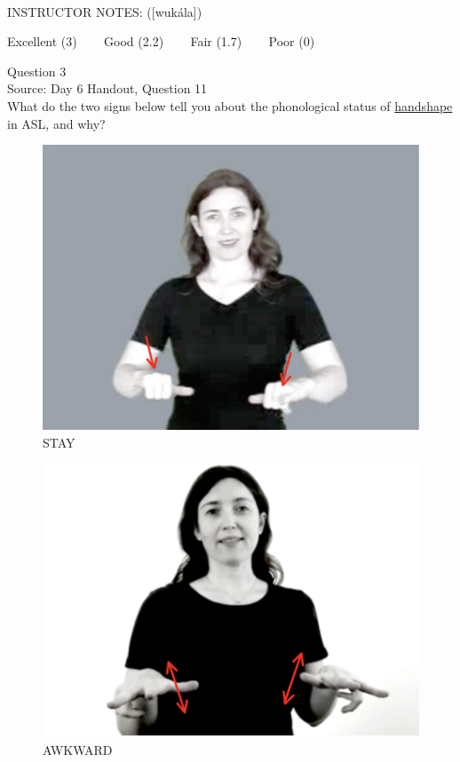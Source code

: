 \documentclass[12pt]{article}
\begin{document}
~\\
INSTRUCTOR NOTES: ([wukála])


\vfill
Excellent (3) ~~~ Good (2.2) ~~~ Fair (1.7) ~~~ Poor (0)
\newpage

{\large Question 3}\\

Source: Day 6 Handout, Question 11\\

What do the two signs below tell you about the phonological status of \underline{handshape} in ASL, and why?\\

\begin{figure}[H]
\includegraphics{../images/asl_stay.png}
\caption{STAY}
\end{figure}
\begin{figure}[H]
\includegraphics{../images/asl_awkward.png}
\caption{AWKWARD}
\end{figure}
\end{document}
